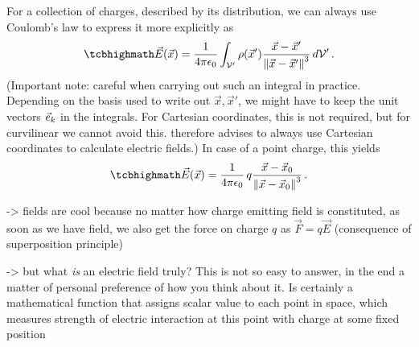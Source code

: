 \documentclass[../class_mech_main.tex]{subfiles}
\DeclareMathOperator{\fpeps}{\frac{1}{4 \pi \epsilon_0}}
\begin{document}
For a collection of charges, described by its distribution, we can always use Coulomb's law to express it more explicitly as
\begin{equation}\label{eq:efield_general}
    \eqbox{
        \vec{E}(\vec{x}) = \fpeps \int_{\mathcal{V}'} \rho(\vec{x}') \frac{\vec{x} - \vec{x}'}{\norm{\vec{x} - \vec{x}'}^3} \, d\mathcal{V}'
    } \, .
\end{equation}
(Important note: careful when carrying out such an integral in practice. Depending on the basis used to write out $\vec{x}, \vec{x}'$, we might have to keep the unit vectors $\vec{e}_{k}$ in the integrals. For Cartesian coordinates, this is not required, but for curvilinear we cannot avoid this. \cite{Griffiths_2017} therefore advises to always use Cartesian coordinates to calculate electric fields.) In case of a point charge, this yields
\begin{equation}
    \eqbox{
        \vec{E}(\vec{x}) = \fpeps q \frac{\vec{x} - \vec{x}_0}{\norm{\vec{x} - \vec{x}_0}^3}
    } \, .
\end{equation}

-> fields are cool because no matter how charge emitting field is constituted, as soon as we have field, we also get the force on charge $q$ as $\vec{F} = q \vec{E}$ (consequence of superposition principle)


-> but what \emph{is} an electric field truly? This is not so easy to answer, in the end a matter of personal preference of how you think about it. Is certainly a mathematical function that assigns scalar value to each point in space, which measures strength of electric interaction at this point with charge at some fixed position
\end{document}
